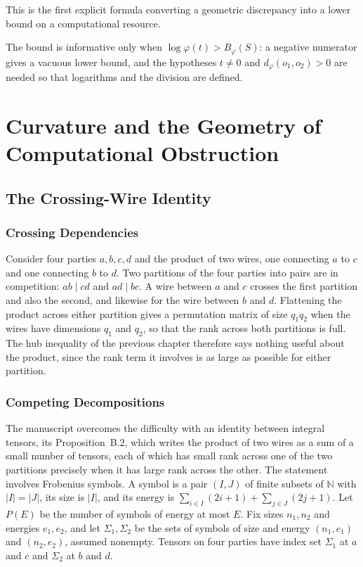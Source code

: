 \documentclass[11pt,letterpaper]{report}
\theoremstyle{plain}
\theoremstyle{definition}
\theoremstyle{remark}
\begin{document}
This is the first explicit formula converting a geometric discrepancy into a lower bound on a computational resource.

The bound is informative only when $\log\varphi(t)>B_\varphi(S)$: a negative numerator gives a vacuous lower bound, and the hypotheses $t\ne0$ and $d_\varphi(o_1,o_2)>0$ are needed so that logarithms and the division are defined.

\part{Curvature and the Geometry of Computational Obstruction}

\chapter{The Crossing-Wire Identity}

\section{Crossing Dependencies}

Consider four parties $a,b,c,d$ and the product of two wires, one connecting $a$ to $c$ and one connecting $b$ to $d$. Two partitions of the four parties into pairs are in competition: $ab\mid cd$ and $ad\mid bc$. A wire between $a$ and $c$ crosses the first partition and also the second, and likewise for the wire between $b$ and $d$. Flattening the product across either partition gives a permutation matrix of size $q_1q_2$ when the wires have dimensions $q_1$ and $q_2$, so that the rank across both partitions is full. The hub inequality of the previous chapter therefore says nothing useful about the product, since the rank term it involves is as large as possible for either partition.

\section{Competing Decompositions}\label{sec:competing}

The manuscript overcomes the difficulty with an identity between integral tensors, its Proposition~B.2, which writes the product of two wires as a sum of a small number of tensors, each of which has small rank across one of the two partitions precisely when it has large rank across the other. The statement involves Frobenius symbols. A symbol is a pair $(I,J)$ of finite subsets of $\mathbb N$ with $|I|=|J|$, its size is $|I|$, and its energy is $\sum_{i\in I}(2i+1)+\sum_{j\in J}(2j+1)$. Let $P(E)$ be the number of symbols of energy at most $E$. Fix sizes $n_1,n_2$ and energies $e_1,e_2$, and let $\Sigma_1,\Sigma_2$ be the sets of symbols of size and energy $(n_1,e_1)$ and $(n_2,e_2)$, assumed nonempty. Tensors on four parties have index set $\Sigma_1$ at $a$ and $c$ and $\Sigma_2$ at $b$ and $d$.
\end{document}
